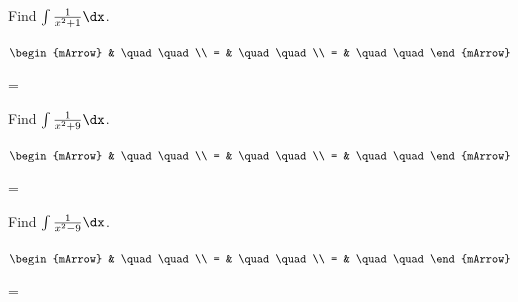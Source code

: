 \begin{mtask}
   \task \begin{exercise} Find $\int \frac{1}{x^2+1} \dx$.
           \begin{envSolution}
             $\begin{mArrow}
                   & \quad \quad              \\
		   		 = & \quad \quad              \\
				 = & \quad \quad 
              \end{mArrow}$
            \begin{shortsolution}  
			     =$ \quad \quad \quad \quad$
			\end{shortsolution}				 
           \end{envSolution}
         \end{exercise}


   \task \begin{exercise} Find $\int \frac{1}{x^2+9} \dx$.
           \begin{envSolution}
             $\begin{mArrow}
                   & \quad \quad              \\
		   		 = & \quad \quad              \\
				 = & \quad \quad 
              \end{mArrow}$
            \begin{shortsolution}  
			     =$ \quad \quad \quad \quad$
			\end{shortsolution}				 
           \end{envSolution}
         \end{exercise}

   \task \begin{exercise} Find $\int \frac{1}{x^2-9} \dx$.
           \begin{envSolution}
             $\begin{mArrow}
                   & \quad \quad              \\
		   		 = & \quad \quad              \\
				 = & \quad \quad 
              \end{mArrow}$
            \begin{shortsolution}  
			     =$ \quad \quad \quad \quad$
			\end{shortsolution}				 
           \end{envSolution}
         \end{exercise}


\end{mtask}

